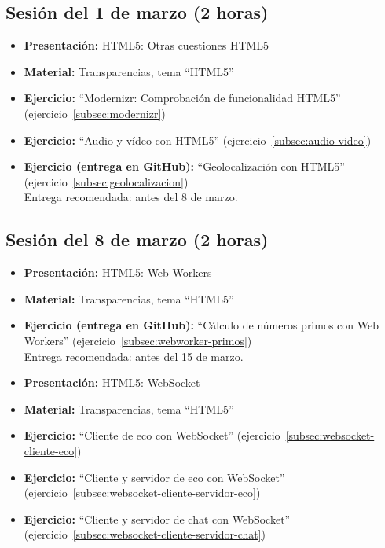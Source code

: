 \documentclass[a4paper,12pt]{report}
\begin{document}
\subsection{Sesión del 1 de marzo (2 horas)}

\begin{itemize}
 \item \textbf{Presentación:} HTML5: Otras cuestiones HTML5
 \item \textbf{Material:} Transparencias, tema ``HTML5''
 \item \textbf{Ejercicio:} ``Modernizr: Comprobación de funcionalidad HTML5'' (ejercicio~\ref{subsec:modernizr})
 \item \textbf{Ejercicio:} ``Audio y vídeo con HTML5'' (ejercicio~\ref{subsec:audio-video})
 \item \textbf{Ejercicio (entrega en GitHub):} ``Geolocalización con HTML5'' (ejercicio~\ref{subsec:geolocalizacion}) 
 \\
Entrega recomendada: antes del 8 de marzo.
\end{itemize}


\subsection{Sesión del 8 de marzo (2 horas)}

\begin{itemize}
 \item \textbf{Presentación:} HTML5: Web Workers
 \item \textbf{Material:} Transparencias, tema ``HTML5''
 \item \textbf{Ejercicio (entrega en GitHub):} ``Cálculo de números primos con Web Workers'' (ejercicio~\ref{subsec:webworker-primos})
 \\
Entrega recomendada: antes del 15 de marzo.
 \item \textbf{Presentación:} HTML5: WebSocket
 \item \textbf{Material:} Transparencias, tema ``HTML5''
 \item \textbf{Ejercicio:} ``Cliente de eco con WebSocket'' (ejercicio~\ref{subsec:websocket-cliente-eco})
 \item \textbf{Ejercicio:} ``Cliente y servidor de eco con WebSocket'' (ejercicio~\ref{subsec:websocket-cliente-servidor-eco})
 \item \textbf{Ejercicio:} ``Cliente y servidor de chat con WebSocket'' (ejercicio~\ref{subsec:websocket-cliente-servidor-chat})
\end{itemize}
\end{document}

